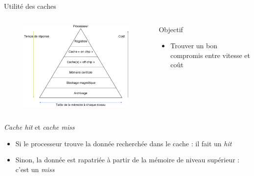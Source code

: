 \begin{frame}{Utilité des caches}
	\begin{columns}[c]
		\begin{column}{.5\textwidth}
			\begin{figure}[h!]
				\includegraphics[scale=.45]{images/hierarchy.png}
			\end{figure}
		\end{column}
		\begin{column}{.5\textwidth}
			\begin{block}{Objectif}
				\begin{itemize}
					\item{Trouver un bon compromis entre vitesse et coût}
				\end{itemize}
			\end{block}
		\end{column}
	\end{columns}
	\begin{block}{\emph{Cache hit} et \emph{cache miss}}
		\begin{itemize}
			\item{Si le processeur trouve la donnée recherchée dans le cache : il fait un \emph{hit}}
			\item{Sinon, la donnée est rapatriée à partir de la mémoire de niveau supérieur : c'est un \emph{miss}}
		\end{itemize}
	\end{block}
\end{frame}


